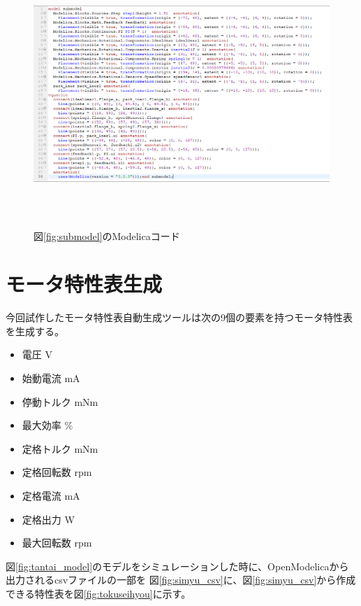   \begin{figure}[t]
	\centering
	\includegraphics[width=16.5cm,height=10cm]{./Image/sub_modelica.png}
	\caption{図\ref{fig:submodel}のModelicaコード}
	\label{fig:sub_modelica}
  \end{figure}

  \clearpage

  \section{モータ特性表生成}\label{kenkyu_mokuteki}
今回試作したモータ特性表自動生成ツールは次の9個の要素を持つモータ特性表を生成する。

\begin{itemize}
	\item 電圧 V
	\item 始動電流 mA
	\item 停動トルク mNm
	\item 最大効率 \%
	\item 定格トルク mNm 
	\item 定格回転数 rpm
	\item 定格電流 mA
	\item 定格出力 W
	\item 最大回転数 rpm 
\end{itemize}

図\ref{fig:tantai_model}のモデルをシミュレーションした時に、OpenModelicaから出力されるcsvファイルの一部を
図\ref{fig:simyu_csv}に、図\ref{fig:simyu_csv}から作成できる特性表を図\ref{fig:tokuseihyou}に示す。

